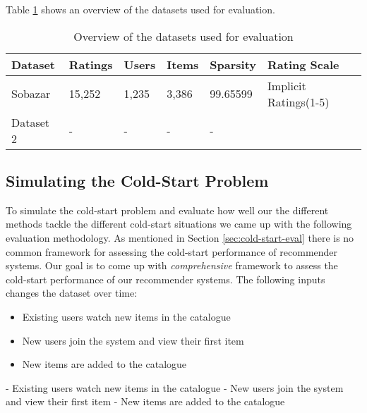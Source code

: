 Table \ref{table:datasets} shows an overview of the datasets used for evaluation.


\begin{table}[H]
    \centering
    \begin{tabular}{|l|l|l|l|l|l|}
    \hline
	Dataset			& 	Ratings 	& 	Users	& 	Items 	& 	Sparsity	& Rating Scale 				\\ \hline
	Sobazar 		& 	15,252  	& 	1,235	&	3,386	&	99.65599	& Implicit Ratings(1-5)		\\ \hline
	Dataset 2 		& 	-  			& 	-		&	-		&	-			&							\\ \hline
    \end{tabular}
    \label{table:datasets}
    \caption [Overview of the datasets used for evaluation]{Overview of the datasets used for evaluation}
\end{table}


\subsection{Simulating the Cold-Start Problem}

To simulate the cold-start problem and evaluate how well our the different methods tackle the different cold-start situations we came up with the following evaluation methodology. As mentioned in Section \ref{sec:cold-start-eval} there is no common framework for assessing the cold-start performance of recommender systems. Our goal is to come up with \emph{comprehensive} framework to assess the cold-start performance of our recommender systems. The following inputs changes the dataset over time:

\begin{itemize}
	\item Existing users watch new items in the catalogue
	\item	New users join the system and view their first item
	\item	New items are added to the catalogue
\end{itemize}

	- Existing users watch new items in the catalogue
	- New users join the system and view their first item
	- New items are added to the catalogue

